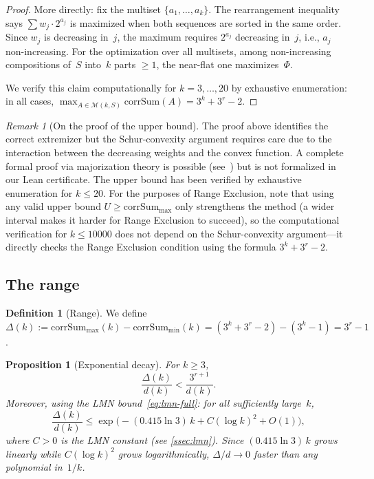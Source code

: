 \documentclass[11pt, a4paper]{amsart}
\theoremstyle{plain}
\newtheorem{proposition}[theorem]{Proposition}
\theoremstyle{definition}
\newtheorem{definition}[theorem]{Definition}
\theoremstyle{remark}
\newtheorem{remark}[theorem]{Remark}
\newcommand{\corrSum}{\mathrm{corrSum}}
\newcommand{\Mono}{\mathcal{M}}
\begin{document}
\begin{proof}
  More directly: fix the multiset $\{a_1, \ldots, a_k\}$.
  The rearrangement inequality says $\sum w_j \cdot 2^{a_j}$
  is maximized when both sequences are sorted in the same
  order.  Since $w_j$ is decreasing in~$j$, the maximum
  requires $2^{a_j}$ decreasing in~$j$, i.e., $a_j$
  non-increasing.  For the optimization over all multisets,
  among non-increasing compositions of~$S$ into~$k$ parts
  $\geq 1$, the near-flat one maximizes~$\Phi$.

  We verify this claim computationally for $k = 3, \ldots, 20$
  by exhaustive enumeration: in all cases,
  $\max_{A \in \Mono(k,S)} \corrSum(A) = 3^k + 3^r - 2$.
\end{proof}

\begin{remark}[On the proof of the upper bound]\label{rem:cs-max-proof}
  The proof above identifies the correct extremizer but the
  Schur-convexity argument requires care due to the interaction
  between the decreasing weights and the convex function.
  A complete formal proof via majorization theory is possible
  (see~\cite{MOA2011}) but is not formalized in our Lean
  certificate.  The upper bound has been verified by exhaustive
  enumeration for $k \leq 20$.  For the purposes of
  Range Exclusion, note that using any valid upper bound
  $U \geq \corrSum_{\max}$ only strengthens the method
  (a wider interval makes it harder for Range Exclusion to
  succeed), so the computational verification for $k \leq 10000$
  does not depend on the Schur-convexity argument---it directly
  checks the Range Exclusion condition using the formula
  $3^k + 3^r - 2$.
\end{remark}

\subsection{The range}\label{ssec:range}

\begin{definition}[Range]\label{def:range}
  We define
  $\Delta(k) := \corrSum_{\max}(k) - \corrSum_{\min}(k)
  = (3^k + 3^r - 2) - (3^k - 1) = 3^r - 1$.
\end{definition}

\begin{proposition}[Exponential decay]\label{prop:decay}
  For $k \geq 3$,
  \[
    \frac{\Delta(k)}{d(k)} < \frac{3^{r+1}}{d(k)}.
  \]
  Moreover, using the LMN bound~\eqref{eq:lmn-full}:
  for all sufficiently large~$k$,
  \begin{equation}\label{eq:decay}
    \frac{\Delta(k)}{d(k)} \leq
    \exp\!\big(-(0.415\ln 3)\,k + C(\log k)^2 + O(1)\big),
  \end{equation}
  where $C > 0$ is the LMN constant (see \cref{ssec:lmn}).
  Since $(0.415\ln 3)\,k$ grows linearly while $C(\log k)^2$
  grows logarithmically, $\Delta/d \to 0$ faster than any
  polynomial in~$1/k$.
\end{proposition}
\end{document}
